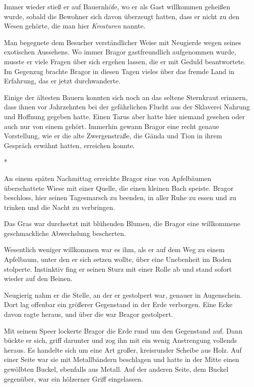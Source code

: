 \documentclass[10pt, a4paper, oneside]{book}
\begin{document}
\begin{multicols}{2}
Immer wieder stieß er auf Bauernhöfe, wo er als Gast willkommen geheißen wurde, sobald die Bewohner sich davon überzeugt hatten, dass er nicht zu den Wesen gehörte, die man hier \textit{Kreaturen} nannte. 

Man begegnete dem Besucher verständlicher Weise mit Neugierde wegen seines exotischen Aussehens. Wo immer Bragor gastfreundlich aufgenommen wurde, musste er viele Fragen über sich ergehen lassen, die er mit Geduld beantwortete. Im Gegenzug brachte Bragor in diesen Tagen vieles über das fremde Land in Erfahrung, das er jetzt durchwanderte. 

Einige der ältesten Bauern konnten sich noch an das seltene Sternkraut erinnern, dass ihnen vor Jahrzehnten bei der gefährlichen Flucht aus der Sklaverei Nahrung und Hoffnung gegeben hatte. Einen Tarus aber hatte hier niemand gesehen oder auch nur von einem gehört. Immerhin gewann Bragor eine recht genaue Vorstellung, wie er die alte Zwergenstraße, die Gända und Tion in ihrem Gespräch erwähnt hatten, erreichen konnte. 

\begin{center}
    *
\end{center}

An einem späten Nachmittag erreichte Bragor eine von Apfelbäumen überschattete Wiese mit einer Quelle, die einen kleinen Bach speiste. Bragor beschloss, hier seinen Tagesmarsch zu beenden, in aller Ruhe zu essen und zu trinken und die Nacht zu verbringen. 

Das Gras war durchsetzt mit blühenden Blumen, die Bragor eine willkommene geschmackliche Abwechslung bescherten. 

Wesentlich weniger willkommen war es ihm, als er auf dem Weg zu einem Apfelbaum, unter den er sich setzen wollte, über eine Unebenheit im Boden stolperte. Instinktiv fing er seinen Sturz mit einer Rolle ab und stand sofort wieder auf den Beinen. 

Neugierig nahm er die Stelle, an der er gestolpert war, genauer in Augenschein. Dort lag offenbar ein größerer Gegenstand in der Erde verborgen. Eine Ecke davon ragte heraus, und über die war Bragor gestolpert. 

Mit seinem Speer lockerte Bragor die Erde rund um den Gegenstand auf. Dann bückte er sich, griff darunter und zog ihn mit ein wenig Anstrengung vollends heraus. Es handelte sich um eine Art großer, kreisrunder Scheibe aus Holz. Auf einer Seite war sie mit Metallbändern beschlagen und hatte in der Mitte einen gewölbten Buckel, ebenfalls aus Metall. Auf der anderen Seite, dem Buckel gegenüber, war ein hölzerner Griff eingelassen. 


\end{multicols}
\end{document}
